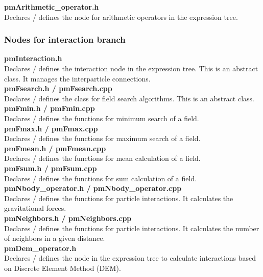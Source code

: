 \documentclass[a4paper,12pt,openany]{book}
\theoremstyle{break}
\begin{document}
\textbf{pmArithmetic\_operator.h} \\
Declares / defines the node for arithmetic operators in the expression tree. \\


\subsubsection{Nodes for interaction branch}
\textbf{pmInteraction.h} \\
Declares / defines the interaction node in the expression tree. This is an abstract class. It manages the interparticle connections. \\

\textbf{pmFsearch.h / pmFsearch.cpp} \\
Declares / defines the class for field search algorithms. This is an abstract class. \\

\textbf{pmFmin.h / pmFmin.cpp} \\
Declares / defines the functions for minimum search of a field.  \\

\textbf{pmFmax.h / pmFmax.cpp} \\
Declares / defines the functions for maximum search of a field. \\

\textbf{pmFmean.h / pmFmean.cpp} \\
Declares / defines the functions for mean calculation of a field. \\

\textbf{pmFsum.h / pmFsum.cpp} \\
Declares / defines the functions for sum calculation of a field. \\

\textbf{pmNbody\_operator.h / pmNbody\_operator.cpp} \\
Declares / defines the functions for particle interactions. It calculates the gravitational forces. \\

\textbf{pmNeighbors.h / pmNeighbors.cpp} \\
Declares / defines the functions for particle interactions. It calculates the number of neighbors in a given distance. \\

\textbf{pmDem\_operator.h} \\
Declares / defines the node in the expression tree to calculate interactions based on Discrete Element Method (DEM). \\
\end{document}
